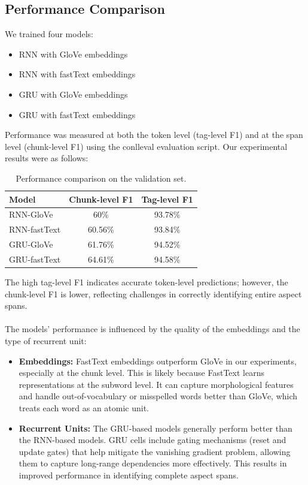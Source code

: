 \documentclass{article}
\begin{document}
\subsection{Performance Comparison}
We trained four models:
\begin{itemize}
    \item RNN with GloVe embeddings
    \item RNN with fastText embeddings
    \item GRU with GloVe embeddings
    \item GRU with fastText embeddings
\end{itemize}
Performance was measured at both the token level (tag-level F1) and at the span level (chunk-level F1) using the conlleval evaluation script. Our experimental results were as follows:
\begin{table}[H]
\centering
\begin{tabular}{lcc}
\hline
\textbf{Model} & \textbf{Chunk-level F1} & \textbf{Tag-level F1} \\ \hline
RNN-GloVe    & 60\%   & 93.78\% \\
RNN-fastText  & 60.56\%   & 93.84\% \\
GRU-GloVe    & 61.76\%   & 94.52\% \\
GRU-fastText  & 64.61\%   & 94.58\% \\ \hline
\end{tabular}
\caption{Performance comparison on the validation set.}
\label{tab:performance}
\end{table}
\vspace{0.2cm}

The high tag-level F1 indicates accurate token-level predictions; however, the chunk-level F1 is lower, reflecting challenges in correctly identifying entire aspect spans.\\
\\
The models' performance is influenced by the quality of the embeddings and the type of recurrent unit:
\begin{itemize}
    \item \textbf{Embeddings:} FastText embeddings outperform GloVe in our experiments, especially at the chunk level. This is likely because FastText learns representations at the subword level. It can capture morphological features and handle out-of-vocabulary or misspelled words better than GloVe, which treats each word as an atomic unit.
    \item \textbf{Recurrent Units:} The GRU-based models generally perform better than the RNN-based models. GRU cells include gating mechanisms (reset and update gates) that help mitigate the vanishing gradient problem, allowing them to capture long-range dependencies more effectively. This results in improved performance in identifying complete aspect spans.
\end{itemize}
\end{document}
